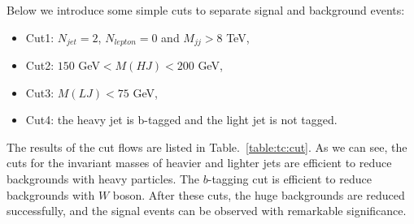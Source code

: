 \documentclass[a4paper,11pt]{article}
\begin{document}
Below we introduce some simple cuts to separate signal and background events:
\begin{itemize}
  \item Cut1: $N_{jet}=2$, $N_{lepton}=0$ and $M_{jj}>8$ TeV,
  \item Cut2: $150$ GeV$<M(HJ)<200$ GeV,
  \item Cut3: $M(LJ)<75$ GeV,
  \item Cut4: the heavy jet is b-tagged and the light jet is not tagged.
\end{itemize}
The results of the cut flows are listed in Table.~\ref{table:tc:cut}. As we can see, the cuts for the invariant masses of heavier and lighter jets are efficient to reduce backgrounds with heavy particles. 
The $b$-tagging cut is efficient to reduce backgrounds with $W$ boson. 
After these cuts, the huge backgrounds are reduced successfully, 
and the signal events can be observed with remarkable significance. 
\end{document}
